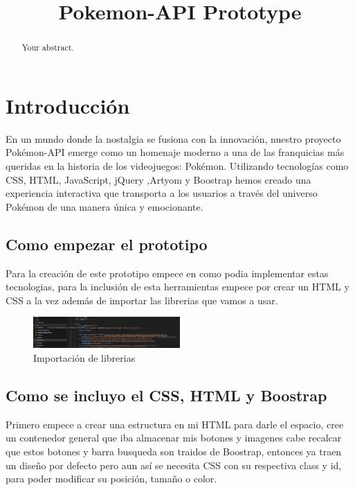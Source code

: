 \documentclass[conference]{IEEEtran}
\title{Pokemon-API Prototype}
\author{\IEEEauthorblockN{Juan David Cotacio Sánchez}}
\begin{document}
\maketitle

\begin{abstract}
Your abstract.
\end{abstract}

\section{Introducción}
En un mundo donde la nostalgia se fusiona con la innovación, nuestro proyecto Pokémon-API emerge como un homenaje moderno a una de las franquicias más queridas en la historia de los videojuegos: Pokémon. Utilizando tecnologías como CSS, HTML, JavaScript, jQuery ,Artyom y Boostrap hemos creado una experiencia interactiva que transporta a los usuarios a través del universo Pokémon de una manera única y emocionante.


\subsection{Como empezar el prototipo}

Para la creación de este prototipo empece en como podia implementar estas tecnologias, para la inclusión de esta herramientas empece por crear un HTML y CSS a la vez además de importar las librerias que vamos a usar.
\begin{figure}[h] %
    \centering
    \includegraphics[width=0.5\textwidth]{images/Librerias.png} %
    \caption{Importación de librerias}
    \label{fig:mi_imagen}
\end{figure}

\subsection{Como se incluyo el CSS, HTML y Boostrap}
Primero empece a crear una estructura en mi HTML para darle el espacio, cree un contenedor general que iba almacenar mis botones y imagenes cabe recalcar que estos botones y barra busqueda son traidos de Boostrap, entonces ya traen un diseño por defecto pero aun así se necesita CSS con su respectiva class y id, para poder modificar su posición, tamaño o color.
\end{document}
